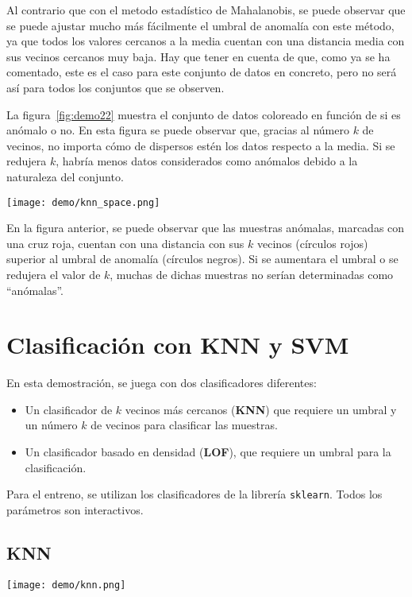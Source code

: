 Al contrario que con el metodo estadístico de Mahalanobis, se puede observar que se puede ajustar mucho más
fácilmente el umbral de anomalía con este método, ya que todos los valores cercanos a la media cuentan con una
distancia media con sus vecinos cercanos muy baja. Hay que tener en cuenta de que, como ya se ha comentado,
este es el caso para este conjunto de datos en concreto, pero no será así para todos los conjuntos que se observen.

La figura~\ref{fig:demo22} muestra el conjunto de datos coloreado en función de si es anómalo o no. En esta figura
se puede observar que, gracias al número $k$ de vecinos, no importa cómo de dispersos estén los datos respecto a
la media. Si se redujera $k$, habría menos datos considerados como anómalos debido a la naturaleza del conjunto.

\noindent
\begin{minipage}{\linewidth}
	\centering
	\texttt{[image: demo/knn\_space.png]}
	\label{fig:demo22}
\end{minipage}

En la figura anterior, se puede observar que las muestras anómalas, marcadas con una cruz roja, cuentan con una
distancia con sus $k$ vecinos (círculos rojos) superior al umbral de anomalía (círculos negros). Si se aumentara
el umbral o se redujera el valor de $k$, muchas de dichas muestras no serían determinadas como ``anómalas''.
\newpage{}
\section{Clasificación con KNN y SVM}
En esta demostración, se juega con dos clasificadores diferentes:
\begin{itemize}
	\item Un clasificador de $k$ vecinos más cercanos (\textbf{KNN}) que requiere un umbral y un
		número $k$ de vecinos para clasificar las muestras.
	\item Un clasificador basado en densidad (\textbf{LOF}), que requiere un umbral para la
	clasificación.
\end{itemize}

Para el entreno, se utilizan los clasificadores de la librería \Verb#sklearn#. Todos los parámetros son interactivos.

\subsection{KNN}
\noindent
\begin{minipage}{\linewidth}
	\centering
	\texttt{[image: demo/knn.png]}
	\label{fig:demo31}
\end{minipage}

